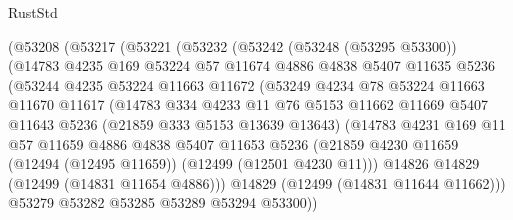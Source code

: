 \begin{lexlean}{RustStd}
\begin{coremodule}
              (@53208
                (@53217
                  (@53221
                    (@53232
                      (@53242
                        (@53248 (@53295 @53300))
                        (@14783
                          @4235
                          @169
                          @53224
                          @57
                          @11674
                          @4886
                          @4838
                          @5407
                          @11635
                          @5236
                          (@53244
                            @4235
                            @53224
                            @11663
                            @11672
                            (@53249
                              @4234
                              @78
                              @53224
                              @11663
                              @11670
                              @11617
                              (@14783
                                @334
                                @4233
                                @11
                                @76
                                @5153
                                @11662
                                @11669
                                @5407
                                @11643
                                @5236
                                (@21859 @333 @5153 @13639 @13643)
                                (@14783
                                  @4231
                                  @169
                                  @11
                                  @57
                                  @11659
                                  @4886
                                  @4838
                                  @5407
                                  @11653
                                  @5236
                                  (@21859
                                    @4230
                                    @11659
                                    (@12494 (@12495 @11659))
                                    (@12499 (@12501 @4230 @11)))
                                  @14826
                                  @14829
                                  (@12499 (@14831 @11654 @4886)))
                                @14829
                                (@12499 (@14831 @11644 @11662)))
                              @53279
                              @53282
                              @53285
                              @53289
                              @53294
                              @53300))

\end{coremodule}
\end{lexlean}
